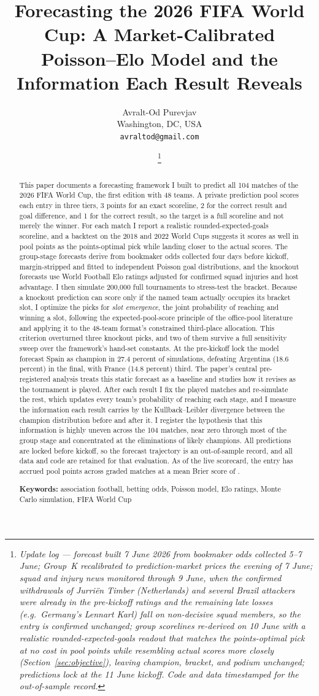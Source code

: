 \documentclass[11pt,letterpaper]{article}
\title{\textbf{Forecasting the 2026 FIFA World Cup: A Market-Calibrated Poisson--Elo Model and the Information Each Result Reveals}}
\author{Avralt-Od Purevjav\\ \small Washington, DC, USA \\ \small \texttt{avraltod@gmail.com}}
\date{\liveVersionLine\thanks{\itshape Update log --- forecast built 7 June 2026 from bookmaker odds collected 5--7 June; Group~K recalibrated to prediction-market prices the evening of 7 June; squad and injury news monitored through 9 June, when the confirmed withdrawals of Jurri\"en Timber (Netherlands) and several Brazil attackers were already in the pre-kickoff ratings and the remaining late losses (e.g.\ Germany's Lennart Karl) fall on non-decisive squad members, so the entry is confirmed unchanged; group scorelines re-derived on 10 June with a realistic rounded-expected-goals readout that matches the points-optimal pick at no cost in pool points while resembling actual scores more closely (Section~\ref{sec:objective}), leaving champion, bracket, and podium unchanged; predictions lock at the 11 June kickoff. Code and data timestamped for the out-of-sample record.\liveUpdateLog{}}}
\begin{document}
\maketitle

\begin{abstract}
\noindent This paper documents a forecasting framework I built to predict all 104 matches of the 2026 FIFA World Cup, the first edition with 48 teams. A private prediction pool scores each entry in three tiers, 3 points for an exact scoreline, 2 for the correct result and goal difference, and 1 for the correct result, so the target is a full scoreline and not merely the winner. For each match I report a realistic rounded-expected-goals scoreline, and a backtest on the 2018 and 2022 World Cups suggests it scores as well in pool points as the points-optimal pick while landing closer to the actual scores. The group-stage forecasts derive from bookmaker odds collected four days before kickoff, margin-stripped and fitted to independent Poisson goal distributions, and the knockout forecasts use World Football Elo ratings adjusted for confirmed squad injuries and host advantage. I then simulate 200{,}000 full tournaments to stress-test the bracket. Because a knockout prediction can score only if the named team actually occupies its bracket slot, I optimize the picks for \emph{slot emergence}, the joint probability of reaching and winning a slot, following the expected-pool-score principle of the office-pool literature and applying it to the 48-team format's constrained third-place allocation. This criterion overturned three knockout picks, and two of them survive a full sensitivity sweep over the framework's hand-set constants. At the pre-kickoff lock the model forecast Spain as champion in 27.4 percent of simulations, defeating Argentina (18.6 percent) in the final, with France (14.8 percent) third.\liveAbstractRevision{} The paper's central pre-registered analysis treats this static forecast as a baseline and studies how it revises as the tournament is played. After each result I fix the played matches and re-simulate the rest, which updates every team's probability of reaching each stage, and I measure the information each result carries by the Kullback--Leibler divergence between the champion distribution before and after it. I register the hypothesis that this information is highly uneven across the 104 matches, near zero through most of the group stage and concentrated at the eliminations of likely champions. All predictions are locked before kickoff, so the forecast trajectory is an out-of-sample record, and all data and code are retained for that evaluation. As of the live scorecard, the entry has accrued \liveCumPoints{} pool points across \liveDocumented{} graded matches at a mean Brier score of \liveMeanBrier{}.

\medskip
\noindent\textbf{Keywords:} association football, betting odds, Poisson model, Elo ratings, Monte Carlo simulation, FIFA World Cup
\end{abstract}
\end{document}
